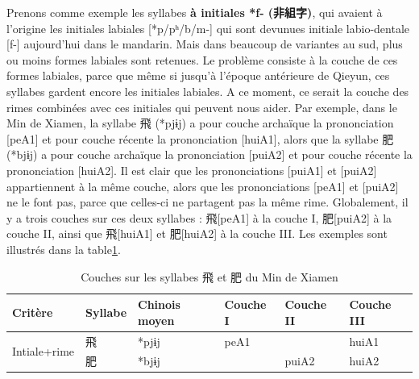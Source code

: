 \documentclass{scrbook}
\newcounter{c}[subsubsection]
\newcommand{\illustre}{Les exemples sont illustrés dans la table\xspace}
\newcommand{\termyyx}[1]{\textbf{#1}}
\begin{document}
\begin{sloppypar}
Prenons comme exemple les syllabes \termyyx {à initiales *f- (非組字)}, qui avaient à l'origine les initiales labiales [*p/pʰ/b/m-] qui sont devunues initiale labio-dentale [f-] aujourd'hui dans le mandarin. Mais dans beaucoup de variantes au sud, plus ou moins formes labiales sont retenues. Le problème consiste à la couche de ces formes labiales, parce que même si jusqu'à l'époque antérieure de Qieyun, ces syllabes gardent encore les initiales labiales. A ce moment, ce serait la couche des rimes combinées avec ces initiales qui peuvent nous aider. Par exemple, dans le Min de Xiamen, la syllabe 飛 (*pjɨj) a pour couche archaïque la prononciation [peA1] et pour couche récente la prononciation [huiA1], alors que la syllabe 肥 (*bjɨj) a pour couche archaïque la prononciation [puiA2] et pour couche récente la prononciation [huiA2]. Il est clair que les prononciations [puiA1] et [puiA2] appartiennent à la même couche, alors que les prononciations [peA1] et [puiA2] ne le font pas, parce que celles-ci ne partagent pas la même rime. Globalement, il y a trois couches sur ces deux syllabes : 飛[peA1] à la couche I, 肥[puiA2] à la couche II, ainsi que 飛[huiA1] et 肥[huiA2] à la couche III. \illustre \ref{tab:exemple_coherent_xiamen}.

\begin{table}[htbp]
  \centering
    \begin{tabular}{lllrll}
    \toprule
    Critère & Syllabe & Chinois moyen  & \multicolumn{1}{l}{Couche I} & Couche II & Couche III \\
    \midrule
    \multirow{2}[2]{*}{Intiale+rime} & 飛     & *pjɨj & \multicolumn{1}{l}{peA1} &       & huiA1 \\
          & 肥     & *bjɨj &       & puiA2 & huiA2 \\
    \bottomrule
    \end{tabular}%
  \caption{Couches sur les syllabes 飛 et 肥 du Min de Xiamen}
  \label{tab:exemple_coherent_xiamen}%
\end{table}%


\end{sloppypar}
\end{document}
